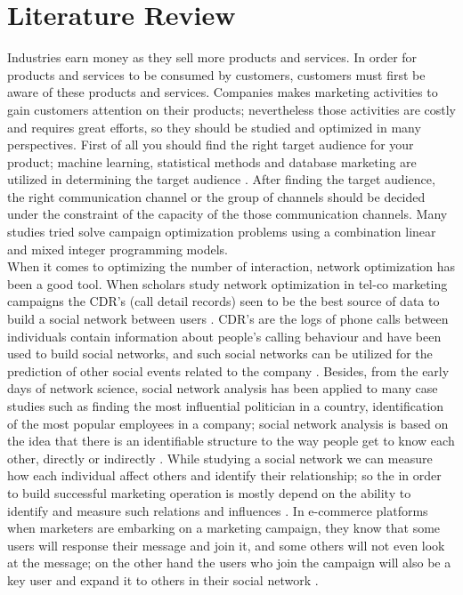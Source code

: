 \documentclass[11pt]{article}
\begin{document}

\section{Literature Review}  \label{s:literature-review}
Industries earn money as they sell more products and services. In order for products and services to be consumed by customers, customers must first be aware of these products and services. Companies makes marketing activities to gain customers attention on their products; nevertheless those activities are costly and requires great efforts, so they should be studied and optimized in many perspectives. First of all you should find the right target audience for your product; machine learning, statistical methods and database marketing are utilized in determining the target audience \citep{cohen_exp, oliveira_hypr, owczarczuk}. After finding the target audience, the right communication channel or the group of channels should be decided under the constraint of the capacity of the those communication channels. Many studies tried solve campaign optimization problems using a combination linear and mixed integer programming models\citep{cohen_exp,fallah_bb, chu_mip}.\\

When it comes to optimizing the number of interaction, network optimization has been a good tool\citep{webster}. When scholars study network optimization in tel-co marketing campaigns the CDR's (call detail records) seen to be the best source of data to build a social network between users \citep{altshuler}. CDR's are the logs of phone calls between individuals contain information about people’s calling behaviour and have been used to build social networks, and such social networks can be utilized for the prediction of other social events related to the company \citep{calzada}. Besides, from the early days of network science, social network analysis has been applied to many case studies such as finding the most influential politician in a country, identification of the most popular employees in a company; social network analysis is based on the idea that there is an identifiable structure to the way people get to know each other, directly or indirectly \citep{maharani}. While studying a social network we can measure how each individual affect others and identify their relationship; so the in order to build successful marketing operation is mostly depend on the ability to identify and measure such relations and influences \citep{houjia, maharani}. In e-commerce platforms when marketers are embarking on a marketing campaign, they know that some users will response their message and join it, and some others will not even look at the message; on the other hand the users who join the campaign will also be a key user and expand it to others in their social network \citep{xiao}. 
\\
\end{document}
